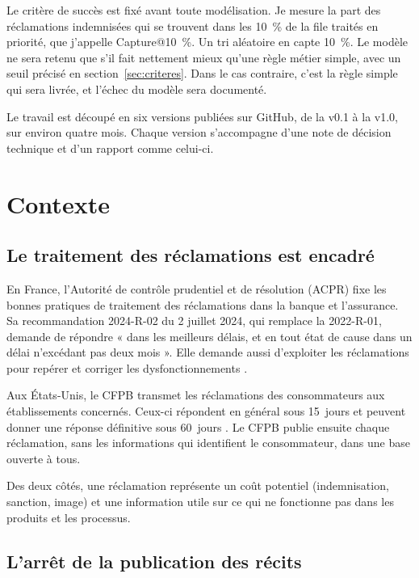 \documentclass[11pt,a4paper]{article}
\begin{document}
Le critère de succès est fixé avant toute modélisation. Je mesure la part des réclamations indemnisées qui se trouvent dans les 10~\% de la file traités en priorité, que j'appelle Capture@10~\%. Un tri aléatoire en capte 10~\%. Le modèle ne sera retenu que s'il fait nettement mieux qu'une règle métier simple, avec un seuil précisé en section~\ref{sec:criteres}. Dans le cas contraire, c'est la règle simple qui sera livrée, et l'échec du modèle sera documenté.

Le travail est découpé en six versions publiées sur GitHub, de la v0.1 à la v1.0, sur environ quatre mois. Chaque version s'accompagne d'une note de décision technique et d'un rapport comme celui-ci.

\section{Contexte}

\subsection{Le traitement des réclamations est encadré}

En France, l'Autorité de contrôle prudentiel et de résolution (ACPR) fixe les bonnes pratiques de traitement des réclamations dans la banque et l'assurance. Sa recommandation 2024-R-02 du 2 juillet 2024, qui remplace la 2022-R-01, demande de répondre « dans les meilleurs délais, et en tout état de cause dans un délai n'excédant pas deux mois ». Elle demande aussi d'exploiter les réclamations pour repérer et corriger les dysfonctionnements \cite{acpr2024,acpr2022}.

Aux États-Unis, le CFPB transmet les réclamations des consommateurs aux établissements concernés. Ceux-ci répondent en général sous 15~jours et peuvent donner une réponse définitive sous 60~jours \cite{cfpbprocess}. Le CFPB publie ensuite chaque réclamation, sans les informations qui identifient le consommateur, dans une base ouverte à tous.

Des deux côtés, une réclamation représente un coût potentiel (indemnisation, sanction, image) et une information utile sur ce qui ne fonctionne pas dans les produits et les processus.

\subsection{L'arrêt de la publication des récits}
\end{document}
